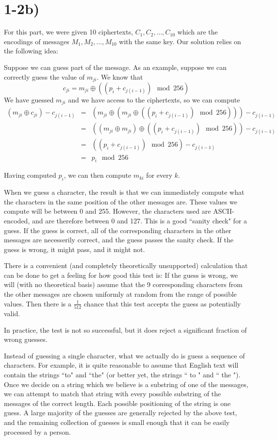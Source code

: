 \documentclass[11pt]{article}
\begin{document}
\newpage
\section*{1-2b)}

For this part, we were given 10 ciphertexts, $C_1, C_2, ..., C_{10}$ which are the encodings of messages $M_1, M_2, ..., M_{10}$ with the same key. Our solution relies on the following idea:

Suppose we can guess part of the message. As an example, suppose we can correctly guess the value of $m_{ji}$. We know that $$c_{ji} = m_{ji} \oplus ((p_i +c_{j(i-1)}) \mod 256)$$
We have guessed $m_{ji}$ and we have access to the ciphertexts, so we can compute 
\begin{eqnarray*}
(m_{ji} \oplus c_{ji}) - c_{j(i-1)} &=& (m_{ji} \oplus (m_{ji} \oplus ((p_i +c_{j(i-1)}) \mod 256))) - c_{j(i-1)}\\
&=& ((m_{ji} \oplus m_{ji}) \oplus ((p_i +c_{j(i-1)}) \mod 256)) - c_{j(i-1)}\\
&=& ((p_i +c_{j(i-1)}) \mod 256) - c_{j(i-1)}\\
&=& p_i \mod 256
\end{eqnarray*}

Having computed $p_i$, we can then compute $m_{ki}$ for every $k$.

When we guess a character, the result is that we can immediately compute what the characters in the same position of the other messages are. These values we compute will be between 0 and 255. However, the characters used are ASCII-encoded, and are therefore between 0 and 127. This is a good ``sanity check" for a guess. If the guess is correct, all of the corresponding characters in the other messages are necesserily correct, and the guess passes the sanity check. If the guess is wrong, it might pass, and it might not. 

There is a convenient (and completely theoretically unsupported) calculation that can be done to get a feeling for how good this test is: If the guess is wrong, we will (with no theoretical basis) assume that the 9 corresponding characters from the other messages are chosen uniformly at random from the range of possible values. Then there is a $\frac{1}{512}$ chance that this test accepts the guess as potentially valid. 

In practice, the test is not so successful, but it does reject a significant fraction of wrong guesses. 

Instead of guessing a single character, what we actually do is guess a sequence of characters. For example, it is quite reasonable to assume that English text will contain the strings ``to" and ``the" (or better yet, the strings `` to " and `` the "). Once we decide on a string which we believe is a substring of one of the messages, we can attempt to match that string with every possible substring of the messages of the correct length. Each possible positioning of the string is one guess. A large majority of the guesses are generally rejected by the above test, and the remaining collection of guesses is small enough that it can be easily processed by a person. 
\end{document}
